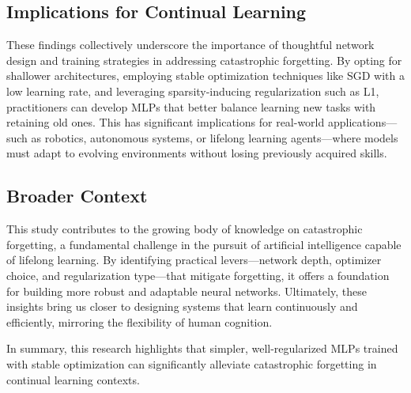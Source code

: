 \documentclass{article}
\begin{document}
\subsection{Implications for Continual Learning}
These findings collectively underscore the importance of thoughtful network design and training strategies in addressing catastrophic forgetting. By opting for shallower architectures, employing stable optimization techniques like SGD with a low learning rate, and leveraging sparsity-inducing regularization such as L1, practitioners can develop MLPs that better balance learning new tasks with retaining old ones. This has significant implications for real-world applications—such as robotics, autonomous systems, or lifelong learning agents—where models must adapt to evolving environments without losing previously acquired skills.

\subsection{Broader Context}
This study contributes to the growing body of knowledge on catastrophic forgetting, a fundamental challenge in the pursuit of artificial intelligence capable of lifelong learning. By identifying practical levers—network depth, optimizer choice, and regularization type—that mitigate forgetting, it offers a foundation for building more robust and adaptable neural networks. Ultimately, these insights bring us closer to designing systems that learn continuously and efficiently, mirroring the flexibility of human cognition.

In summary, this research highlights that simpler, well-regularized MLPs trained with stable optimization can significantly alleviate catastrophic forgetting in continual learning contexts.
\end{document}
